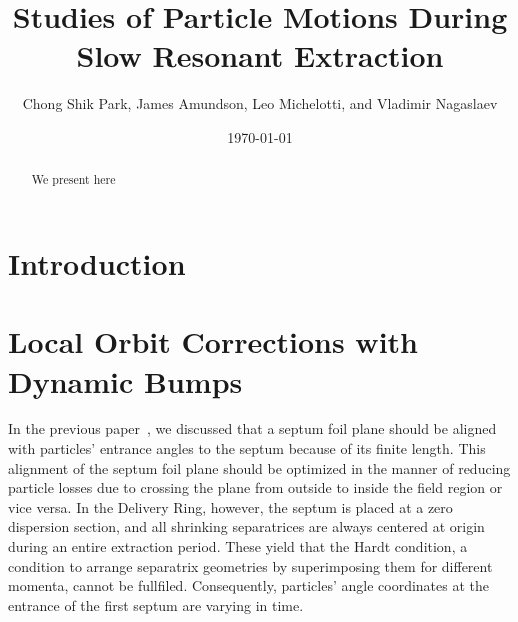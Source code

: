 \documentclass[aps,prstab,onecolumn,preprint,endfloats]{revtex4-1}
\begin{document}
\title{Studies of Particle Motions During Slow Resonant Extraction}
\author{Chong Shik Park, James Amundson, Leo Michelotti, and Vladimir Nagaslaev}
\date{\today}

\begin{abstract}
We present here 
\end{abstract}

\pacs{}
\maketitle

\setcounter{tocdepth}{5}


\section{\label{sec:intro}Introduction}

\clearpage

\section{\label{sec:bump}Local Orbit Corrections with Dynamic Bumps}

In the previous paper~\cite{mu2e}, we discussed that a septum foil plane should be aligned with particles' entrance angles to the septum because of its finite length.
This alignment of the septum foil plane should be optimized in the manner of reducing particle losses due to crossing the plane from outside to inside the field region or vice versa.
In the Delivery Ring, however, the septum is placed at a zero dispersion section, and all shrinking separatrices are always centered at origin during an entire extraction period.
These yield that the Hardt condition, a condition to arrange separatrix geometries by superimposing them for different momenta, cannot be fullfiled.
Consequently, particles' angle coordinates at the entrance of the first septum are varying in time.
\end{document}

